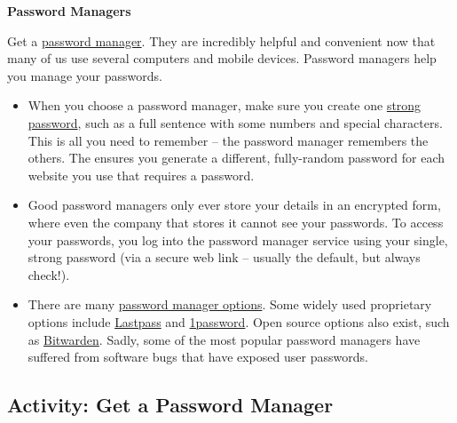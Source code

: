 \documentclass[
]{book}
\providecommand{\tightlist}{%
  \setlength{\itemsep}{0pt}\setlength{\parskip}{0pt}}
\theoremstyle{definition}
\theoremstyle{definition}
\theoremstyle{definition}
\theoremstyle{definition}
\theoremstyle{remark}
\begin{document}
\textbf{Password Managers}

Get a \href{https://en.wikipedia.org/wiki/Password_manager}{password manager}. They are incredibly helpful and convenient now that many of us use several computers and mobile devices. Password managers help you manage your passwords.

\begin{itemize}
\tightlist
\item
  When you choose a password manager, make sure you create one \href{https://www.howtogeek.com/195430/how-to-create-a-strong-password-and-remember-it/}{strong password}, such as a full sentence with some numbers and special characters. This is all you need to remember -- the password manager remembers the others. The ensures you generate a different, fully-random password for each website you use that requires a password.\\
\item
  Good password managers only ever store your details in an encrypted form, where even the company that stores it cannot see your passwords. To access your passwords, you log into the password manager service using your single, strong password (via a secure web link -- usually the default, but always check!).\\
\item
  There are many \href{https://www.google.co.nz/search?q=password+managers\&bshm=rimc/1}{password manager options}. Some widely used proprietary options include \href{https://www.lastpass.com/}{Lastpass} and \href{https://1password.com/}{1password}. Open source options also exist, such as \href{https://bitwarden.com/}{Bitwarden}. Sadly, some of the most popular password managers have suffered from software bugs that have exposed user passwords.
\end{itemize}

\hypertarget{activity-get-a-password-manager}{%
\subsection*{Activity: Get a Password Manager}\label{activity-get-a-password-manager}}
\end{document}
